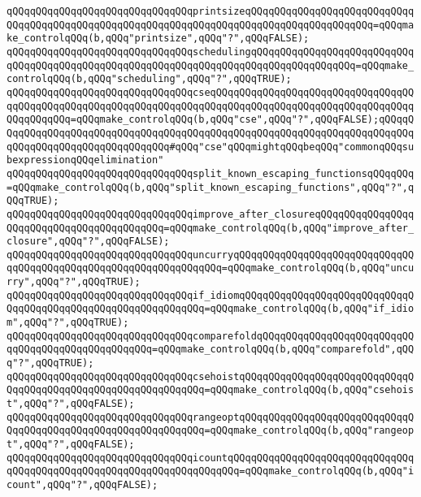 \verb|qQQqqQQqqQQqqQQqqQQqqQQqqQQqqQQqprintsizeqQQqqQQqqQQqqQQqqQQqqQQqqQQqqQQqqQQqqQQqqQQqqQQqqQQqqQQqqQQqqQQqqQQqqQQqqQQqqQQqqQQqqQQqqQQq=qQQqmake_controlqQQq(b,qQQq"printsize",qQQq"?",qQQqFALSE);|\newline
\newline
\verb|qQQqqQQqqQQqqQQqqQQqqQQqqQQqqQQqschedulingqQQqqQQqqQQqqQQqqQQqqQQqqQQqqQQqqQQqqQQqqQQqqQQqqQQqqQQqqQQqqQQqqQQqqQQqqQQqqQQqqQQqqQQq=qQQqmake_controlqQQq(b,qQQq"scheduling",qQQq"?",qQQqTRUE);|\newline
\verb|qQQqqQQqqQQqqQQqqQQqqQQqqQQqqQQqcseqQQqqQQqqQQqqQQqqQQqqQQqqQQqqQQqqQQqqQQqqQQqqQQqqQQqqQQqqQQqqQQqqQQqqQQqqQQqqQQqqQQqqQQqqQQqqQQqqQQqqQQqqQQqqQQqqQQq=qQQqmake_controlqQQq(b,qQQq"cse",qQQq"?",qQQqFALSE);qQQqqQQqqQQqqQQqqQQqqQQqqQQqqQQqqQQqqQQqqQQqqQQqqQQqqQQqqQQqqQQqqQQqqQQqqQQqqQQqqQQqqQQqqQQqqQQqqQQqqQQq#qQQq"cse"qQQqmightqQQqbeqQQq"commonqQQqsubexpressionqQQqelimination"|\newline
\newline
\verb|qQQqqQQqqQQqqQQqqQQqqQQqqQQqqQQqsplit_known_escaping_functionsqQQqqQQq=qQQqmake_controlqQQq(b,qQQq"split_known_escaping_functions",qQQq"?",qQQqTRUE);|\newline
\verb|qQQqqQQqqQQqqQQqqQQqqQQqqQQqqQQqimprove_after_closureqQQqqQQqqQQqqQQqqQQqqQQqqQQqqQQqqQQqqQQqqQQq=qQQqmake_controlqQQq(b,qQQq"improve_after_closure",qQQq"?",qQQqFALSE);|\newline
\newline
\verb|qQQqqQQqqQQqqQQqqQQqqQQqqQQqqQQquncurryqQQqqQQqqQQqqQQqqQQqqQQqqQQqqQQqqQQqqQQqqQQqqQQqqQQqqQQqqQQqqQQqqQQq=qQQqmake_controlqQQq(b,qQQq"uncurry",qQQq"?",qQQqTRUE);|\newline
\verb|qQQqqQQqqQQqqQQqqQQqqQQqqQQqqQQqif_idiomqQQqqQQqqQQqqQQqqQQqqQQqqQQqqQQqqQQqqQQqqQQqqQQqqQQqqQQqqQQqqQQq=qQQqmake_controlqQQq(b,qQQq"if_idiom",qQQq"?",qQQqTRUE);|\newline
\verb|qQQqqQQqqQQqqQQqqQQqqQQqqQQqqQQqcomparefoldqQQqqQQqqQQqqQQqqQQqqQQqqQQqqQQqqQQqqQQqqQQqqQQqqQQq=qQQqmake_controlqQQq(b,qQQq"comparefold",qQQq"?",qQQqTRUE);|\newline
\verb|qQQqqQQqqQQqqQQqqQQqqQQqqQQqqQQqcsehoistqQQqqQQqqQQqqQQqqQQqqQQqqQQqqQQqqQQqqQQqqQQqqQQqqQQqqQQqqQQqqQQq=qQQqmake_controlqQQq(b,qQQq"csehoist",qQQq"?",qQQqFALSE);|\newline
\verb|qQQqqQQqqQQqqQQqqQQqqQQqqQQqqQQqrangeoptqQQqqQQqqQQqqQQqqQQqqQQqqQQqqQQqqQQqqQQqqQQqqQQqqQQqqQQqqQQqqQQq=qQQqmake_controlqQQq(b,qQQq"rangeopt",qQQq"?",qQQqFALSE);|\newline
\verb|qQQqqQQqqQQqqQQqqQQqqQQqqQQqqQQqicountqQQqqQQqqQQqqQQqqQQqqQQqqQQqqQQqqQQqqQQqqQQqqQQqqQQqqQQqqQQqqQQqqQQqqQQq=qQQqmake_controlqQQq(b,qQQq"icount",qQQq"?",qQQqFALSE);|\newline
